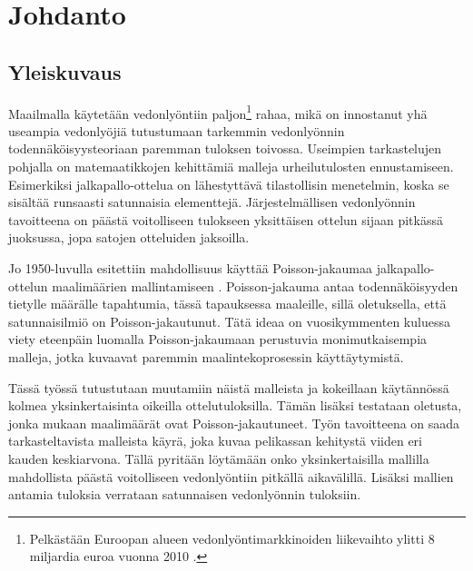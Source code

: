\documentclass[a4paper,finnish,titlepage,12pt]{article}
\begin{document}
\pagestyle{fancy}

\fancyhf{}
\renewcommand{\headrulewidth}{0pt}
\renewcommand{\footrulewidth}{0pt}

\rhead{\footnotesize \thepage} 

\thispagestyle{empty} 



\section{Johdanto}
\subsection{Yleiskuvaus}
Maailmalla käytetään vedonlyöntiin paljon\footnote{Pelkästään Euroopan alueen vedonlyöntimarkkinoiden liikevaihto ylitti 8 miljardia euroa vuonna 2010 \cite{turnover}.} rahaa, mikä on innostanut yhä useampia vedonlyöjiä tutustumaan tarkemmin vedonlyönnin todennäköisyysteoriaan paremman tuloksen toivossa. Useimpien tarkastelujen pohjalla on matemaatikkojen kehittämiä malleja urheilutulosten ennustamiseen. Esimerkiksi jalkapallo-ottelua on lähestyttävä tilastollisin menetelmin, koska se sisältää runsaasti satunnaisia elementtejä. Järjestelmällisen vedonlyönnin tavoitteena on päästä voitolliseen tulokseen yksittäisen ottelun sijaan pitkässä juoksussa, jopa satojen otteluiden jaksoilla.

Jo 1950-luvulla esitettiin mahdollisuus käyttää Poisson-jakaumaa jalkapallo-ottelun maalimäärien mallintamiseen \cite{moroney}. Poisson-jakauma antaa todennäköisyyden tietylle määrälle tapahtumia, tässä tapauksessa maaleille, sillä oletuksella, että satunnaisilmiö on Poisson-jakautunut. Tätä ideaa on vuosikymmenten kuluessa viety eteenpäin luomalla Poisson-jakaumaan perustuvia monimutkaisempia malleja, jotka kuvaavat paremmin maalintekoprosessin käyttäytymistä.

Tässä työssä tutustutaan muutamiin näistä malleista ja kokeillaan käytännössä kolmea yksinkertaisinta oikeilla ottelutuloksilla. Tämän lisäksi testataan oletusta, jonka mukaan maalimäärät ovat Poisson-jakautuneet. Työn tavoitteena on saada tarkasteltavista malleista käyrä, joka kuvaa pelikassan kehitystä viiden eri kauden keskiarvona. Tällä pyritään löytämään onko yksinkertaisilla mallilla mahdollista päästä voitolliseen vedonlyöntiin pitkällä aikavälillä. 
Lisäksi mallien antamia tuloksia verrataan satunnaisen vedonlyönnin tuloksiin.
\end{document}
